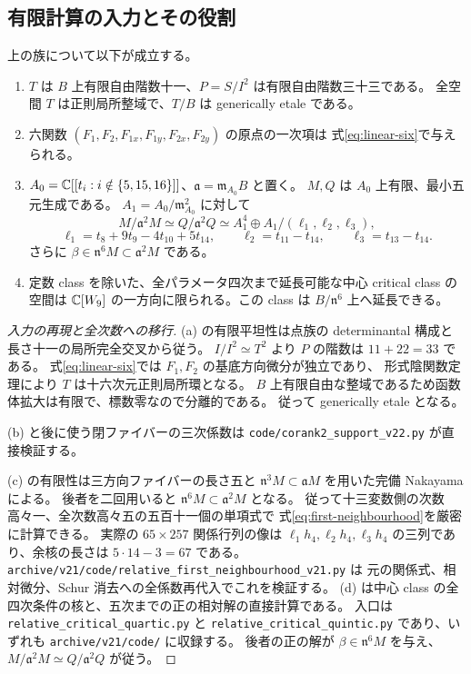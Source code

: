 \subsection{有限計算の入力とその役割}

\begin{proposition}[固定する有限入力]\label{prop:inputs}
上の族について以下が成立する。
\begin{enumerate}[label=(\alph*)]
\item $T$ は $B$ 上有限自由階数十一、$P=S/I^2$ は有限自由階数三十三である。
全空間 $T$ は正則局所整域で、$T/B$ は generically etale である。
\item 六関数 $(F_1,F_2,F_{1x},F_{1y},F_{2x},F_{2y})$ の原点の一次項は
式\eqref{eq:linear-six}で与えられる。
\item $A_0=\mathbb C[[t_i:i\notin\{5,15,16\}]]$、$\mathfrak a=\mathfrak m_{A_0}B$ と置く。
$M,Q$ は $A_0$ 上有限、最小五元生成である。
$A_1=A_0/\mathfrak m_{A_0}^2$ に対して
\begin{equation}\label{eq:first-neighbourhood}
 M/\mathfrak a^2M\simeq Q/\mathfrak a^2Q
 \simeq A_1^4\oplus A_1/(\ell_1,\ell_2,\ell_3),
\end{equation}
\[
 \ell_1=t_8+9t_9-4t_{10}+5t_{14},\qquad
 \ell_2=t_{11}-t_{14},\qquad\ell_3=t_{13}-t_{14}.
\]
さらに $\beta\in\mathfrak n^6M\subset\mathfrak a^2M$ である。
\item 定数 class を除いた、全パラメータ四次まで延長可能な中心 critical class の空間は
$\mathbb C[W_9]$ の一方向に限られる。この class は $B/\mathfrak n^6$ 上へ延長できる。
\end{enumerate}
\end{proposition}

\begin{proof}[入力の再現と全次数への移行]
(a) の有限平坦性は点族の determinantal 構成と長さ十一の局所完全交叉から従う。
$I/I^2\simeq T^2$ より $P$ の階数は $11+22=33$ である。
式\eqref{eq:linear-six}では $F_1,F_2$ の基底方向微分が独立であり、
形式陰関数定理により $T$ は十六次元正則局所環となる。
$B$ 上有限自由な整域であるため函数体拡大は有限で、標数零なので分離的である。
従って generically etale となる。

(b) と後に使う閉ファイバーの三次係数は
\nolinkurl{code/corank2_support_v22.py} が直接検証する。

(c) の有限性は三方向ファイバーの長さ五と
$\mathfrak n^3M\subset\mathfrak aM$ を用いた完備 Nakayama による。
後者を二回用いると $\mathfrak n^6M\subset\mathfrak a^2M$ となる。
従って十三変数側の次数高々一、全次数高々五の五百十一個の単項式で
式\eqref{eq:first-neighbourhood}を厳密に計算できる。
実際の $65\times257$ 関係行列の像は
$\ell_1h_4,\ell_2h_4,\ell_3h_4$ の三列であり、余核の長さは
$5\cdot14-3=67$ である。
\nolinkurl{archive/v21/code/relative_first_neighbourhood_v21.py} は
元の関係式、相対微分、Schur 消去への全係数再代入でこれを検証する。
(d) は中心 class の全四次条件の核と、五次までの正の相対解の直接計算である。
入口は \nolinkurl{relative_critical_quartic.py} と
\nolinkurl{relative_critical_quintic.py} であり、いずれも
\nolinkurl{archive/v21/code/} に収録する。
後者の正の解が $\beta\in\mathfrak n^6M$ を与え、
$M/\mathfrak a^2M\simeq Q/\mathfrak a^2Q$ が従う。
\end{proof}

